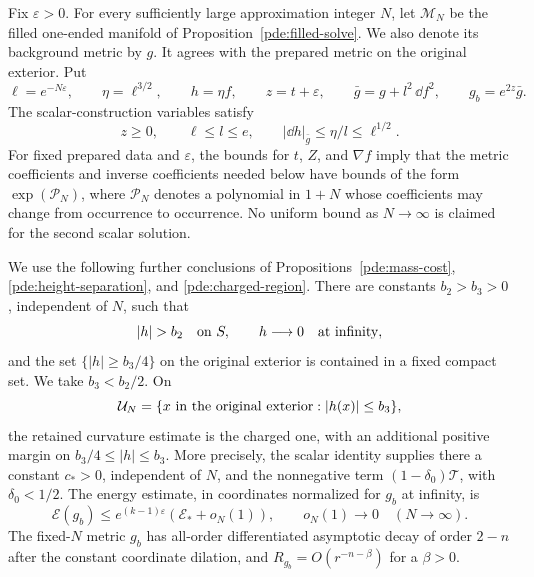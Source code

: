 Fix $\varepsilon>0$.  For every sufficiently large approximation integer
$N$, let $\mathcal M_N$ be the filled one-ended manifold of
Proposition~\ref{pde:filled-solve}.  We also denote its background metric by
$g$.  It agrees with the prepared metric on the original exterior.  Put
\begin{equation}
 \ell=e^{-N\varepsilon},\qquad \eta=\ell^{3/2},\qquad
 h=\eta f,\qquad z=t+\varepsilon,\qquad
 \bar g=g+l^2\,\dd f^2,\qquad g_b=e^{2z}\bar g.
 \label{flux:background-metrics}
\end{equation}
The scalar-construction variables satisfy
\begin{equation}
 z\geq0,\qquad \ell\leq l\leq e,\qquad
 |\dd h|_{\bar g}\leq\eta/l\leq\ell^{1/2}.
 \label{flux:height-gradient}
\end{equation}
For fixed prepared data and $\varepsilon$, the bounds for $t$, $Z$, and
$\nabla f$ imply that the metric coefficients and inverse coefficients
needed below have bounds of the form $\exp(\mathcal P_N)$, where
$\mathcal P_N$ denotes a polynomial in $1+N$ whose coefficients may change
from occurrence to occurrence.  No uniform bound as $N\to\infty$ is claimed
for the second scalar solution.

We use the following further conclusions of
Propositions~\ref{pde:mass-cost}, \ref{pde:height-separation}, and
\ref{pde:charged-region}.  There are constants $b_2>b_3>0$, independent of
$N$, such that
\begin{equation}
 |h|>b_2\quad\hbox{on }S,\qquad h\longrightarrow0
 \quad\hbox{at infinity},
 \label{flux:height-separation}
\end{equation}
and the set $\{|h|\geq b_3/4\}$ on the original exterior is contained in a
fixed compact set.  We take $b_3<b_2/2$.  On
\begin{equation}
 \mathcal U_N=\{x\hbox{ in the original exterior}: |h(x)|\leq b_3\},
 \label{flux:low-region}
\end{equation}
the retained curvature estimate is the charged one, with an additional
positive margin on $b_3/4\leq|h|\leq b_3$.  More precisely, the scalar
identity supplies there a constant $c_*>0$, independent of $N$, and the
nonnegative term $(1-\delta_0)\mathcal T$, with $\delta_0<1/2$.
The energy estimate, in coordinates normalized for $g_b$ at infinity, is
\begin{equation}
 \mathcal E(g_b)\leq
 e^{(k-1)\varepsilon}(\mathcal E_*+o_N(1)),
 \qquad o_N(1)\longrightarrow0
 \quad(N\longrightarrow\infty).
 \label{flux:background-energy}
\end{equation}
The fixed-$N$ metric $g_b$ has all-order differentiated asymptotic decay
of order $2-n$ after the constant coordinate dilation, and
$R_{g_b}=O(r^{-n-\beta})$ for a $\beta>0$.

